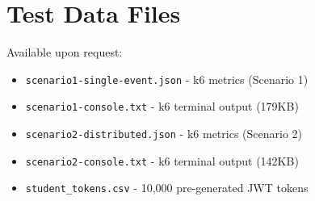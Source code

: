 \documentclass[12pt,a4paper,oneside]{report}
\begin{document}
\chapter{Test Data Files}

Available upon request:
\begin{itemize}[leftmargin=1.5em,topsep=0.3em,itemsep=0.2em]
    \item \texttt{scenario1-single-event.json} - k6 metrics (Scenario 1)
    \item \texttt{scenario1-console.txt} - k6 terminal output (179KB)
    \item \texttt{scenario2-distributed.json} - k6 metrics (Scenario 2)
    \item \texttt{scenario2-console.txt} - k6 terminal output (142KB)
    \item \texttt{student\_tokens.csv} - 10,000 pre-generated JWT tokens
\end{itemize}

\end{document}

